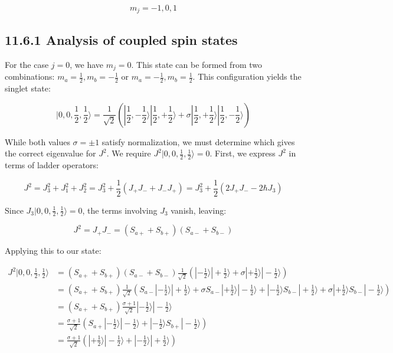 \documentclass[italian]{HKNdocument}
\begin{document}
\begin{equation*}
m_{j}=-1,0,1 \tag{11.57}
\end{equation*}


\subsection*{11.6.1 Analysis of coupled spin states}
For the case $j=0$, we have $m_j=0$. This state can be formed from two combinations: $m_a=\frac{1}{2}, m_b=-\frac{1}{2}$ or $m_a=-\frac{1}{2}, m_b=\frac{1}{2}$. This configuration yields the singlet state:

\begin{equation*}
|0,0,\frac{1}{2},\frac{1}{2}\rangle=\frac{1}{\sqrt{2}}(|\frac{1}{2},-\frac{1}{2}\rangle|\frac{1}{2},+\frac{1}{2}\rangle+\sigma|\frac{1}{2},+\frac{1}{2}\rangle|\frac{1}{2},-\frac{1}{2}\rangle) \tag{11.58}
\end{equation*}

While both values $\sigma=\pm 1$ satisfy normalization, we must determine which gives the correct eigenvalue for $J^2$. We require $J^2|0,0,\frac{1}{2},\frac{1}{2}\rangle=0$. First, we express $J^2$ in terms of ladder operators:

\begin{equation*}
J^{2}=J_{3}^{2}+J_{1}^{2}+J_{2}^{2}=J_{3}^{2}+\frac{1}{2}(J_{+}J_{-}+J_{-}J_{+})=J_{3}^{2}+\frac{1}{2}(2J_{+}J_{-}-2\hbar J_{3}) \tag{11.59}
\end{equation*}

Since $J_3|0,0,\frac{1}{2},\frac{1}{2}\rangle=0$, the terms involving $J_3$ vanish, leaving:

\begin{equation*}
J^{2}=J_{+}J_{-}=(S_{a+}+S_{b+})(S_{a-}+S_{b-}) \tag{11.60}
\end{equation*}

Applying this to our state:

\begin{align*}
J^{2}|0,0,\frac{1}{2},\frac{1}{2}\rangle &= (S_{a+}+S_{b+})(S_{a-}+S_{b-}) \frac{1}{\sqrt{2}}(|-\frac{1}{2}\rangle|+\frac{1}{2}\rangle+\sigma|+\frac{1}{2}\rangle|-\frac{1}{2}\rangle) \\
&= (S_{a+}+S_{b+}) \frac{1}{\sqrt{2}}(S_{a-}|-\frac{1}{2}\rangle|+\frac{1}{2}\rangle+\sigma S_{a-}|+\frac{1}{2}\rangle|-\frac{1}{2}\rangle+|-\frac{1}{2}\rangle S_{b-}|+\frac{1}{2}\rangle+\sigma|+\frac{1}{2}\rangle S_{b-}|-\frac{1}{2}\rangle) \\
&= (S_{a+}+S_{b+}) \frac{\sigma+1}{\sqrt{2}}|-\frac{1}{2}\rangle|-\frac{1}{2}\rangle \\
&= \frac{\sigma+1}{\sqrt{2}}(S_{a+}|-\frac{1}{2}\rangle|-\frac{1}{2}\rangle+|-\frac{1}{2}\rangle S_{b+}|-\frac{1}{2}\rangle) \\
&= \frac{\sigma+1}{\sqrt{2}}(|+\frac{1}{2}\rangle|-\frac{1}{2}\rangle+|-\frac{1}{2}\rangle|+\frac{1}{2}\rangle) \tag{11.61}
\end{align*}
\end{document}
